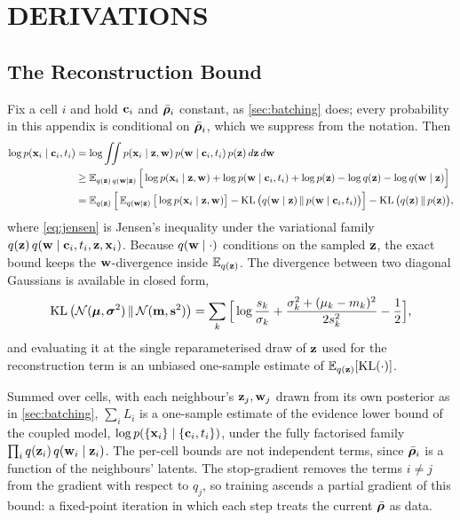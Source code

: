 \section{DERIVATIONS}
\label{app:derivations}

\subsection{The Reconstruction Bound}
\label{app:bound}

Fix a cell $i$ and hold $\mathbf{c}_i$ and $\bar{\boldsymbol{\rho}}_i$ constant, as \cref{sec:batching} does; every probability in this appendix is conditional on $\bar{\boldsymbol{\rho}}_i$, which we suppress from the notation. Then
\begin{align}
  \log p(\mathbf{x}_i \mid \mathbf{c}_i, t_i)
  &= \log \iint p(\mathbf{x}_i \mid \mathbf{z}, \mathbf{w})\, p(\mathbf{w} \mid \mathbf{c}_i, t_i)\, p(\mathbf{z})\, d\mathbf{z}\, d\mathbf{w} \\
  &\geq \operatorname{\mathbb{E}}_{q(\mathbf{z})\,q(\mathbf{w} \mid \mathbf{z})}\Big[\log p(\mathbf{x}_i \mid \mathbf{z}, \mathbf{w}) + \log p(\mathbf{w} \mid \mathbf{c}_i, t_i) + \log p(\mathbf{z}) - \log q(\mathbf{z}) - \log q(\mathbf{w} \mid \mathbf{z})\Big] \label{eq:jensen}\\
  &= \operatorname{\mathbb{E}}_{q(\mathbf{z})}\Big[\operatorname{\mathbb{E}}_{q(\mathbf{w} \mid \mathbf{z})}\big[\log p(\mathbf{x}_i \mid \mathbf{z}, \mathbf{w})\big] - \operatorname{KL}\big(q(\mathbf{w} \mid \mathbf{z})\,\|\,p(\mathbf{w} \mid \mathbf{c}_i, t_i)\big)\Big] - \operatorname{KL}\big(q(\mathbf{z})\,\|\,p(\mathbf{z})\big),
\end{align}
where \cref{eq:jensen} is Jensen's inequality under the variational family $q(\mathbf{z})\,q(\mathbf{w} \mid \mathbf{c}_i, t_i, \mathbf{z}, \mathbf{x}_i)$. Because $q(\mathbf{w} \mid \cdot)$ conditions on the sampled $\mathbf{z}$, the exact bound keeps the $\mathbf{w}$-divergence inside $\operatorname{\mathbb{E}}_{q(\mathbf{z})}$. The divergence between two diagonal Gaussians is available in closed form,
\begin{equation}
  \operatorname{KL}\big(\mathcal{N}(\boldsymbol{\mu}, \boldsymbol{\sigma}^2)\,\|\,\mathcal{N}(\mathbf{m}, \mathbf{s}^2)\big) = \sum_k \Big[\log\frac{s_k}{\sigma_k} + \frac{\sigma_k^2 + (\mu_k - m_k)^2}{2 s_k^2} - \frac{1}{2}\Big],
  \label{eq:gauss-kl}
\end{equation}
and evaluating it at the single reparameterised draw of $\mathbf{z}$ used for the reconstruction term is an unbiased one-sample estimate of $\operatorname{\mathbb{E}}_{q(\mathbf{z})}[\operatorname{KL}(\cdot)]$.

Summed over cells, with each neighbour's $\mathbf{z}_j, \mathbf{w}_j$ drawn from its own posterior as in \cref{sec:batching}, $\sum_i L_i$ is a one-sample estimate of the evidence lower bound of the coupled model, $\log p(\{\mathbf{x}_i\} \mid \{\mathbf{c}_i, t_i\})$, under the fully factorised family $\prod_i q(\mathbf{z}_i)\, q(\mathbf{w}_i \mid \mathbf{z}_i)$. The per-cell bounds are not independent terms, since $\bar{\boldsymbol{\rho}}_i$ is a function of the neighbours' latents. The stop-gradient removes the terms $i \ne j$ from the gradient with respect to $q_j$, so training ascends a partial gradient of this bound: a fixed-point iteration in which each step treats the current $\bar{\boldsymbol{\rho}}$ as data.

